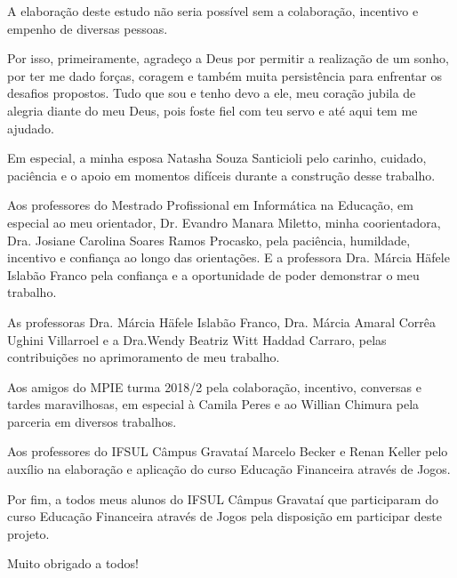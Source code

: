 

\begin{agradecimentos}
A elaboração deste estudo não seria possível sem a colaboração, incentivo e empenho de diversas pessoas.

Por isso, primeiramente, agradeço a Deus por permitir a realização de um sonho, por ter me dado forças, coragem e também muita persistência para enfrentar os desafios propostos. Tudo que sou e tenho devo a ele, meu coração jubila de alegria diante do meu Deus, pois foste fiel com teu servo e até aqui tem me ajudado.

Em especial, a minha esposa Natasha Souza Santicioli pelo carinho, cuidado, paciência e o apoio em momentos difíceis durante a construção desse trabalho.

Aos professores do Mestrado Profissional em Informática na Educação, em especial ao meu orientador, Dr. Evandro Manara Miletto, minha coorientadora, Dra. Josiane Carolina Soares Ramos Procasko, pela paciência, humildade, incentivo e confiança ao longo das orientações. E a professora Dra. Márcia Häfele Islabão Franco pela confiança e a oportunidade de poder demonstrar o meu trabalho.

As professoras Dra. Márcia Häfele Islabão Franco, Dra. Márcia Amaral Corrêa Ughini Villarroel e a Dra.Wendy Beatriz Witt Haddad Carraro, pelas contribuições no aprimoramento de meu trabalho. 

Aos amigos do MPIE turma 2018/2 pela colaboração, incentivo, conversas e tardes maravilhosas, em especial à Camila Peres e ao Willian Chimura pela parceria em diversos trabalhos.

Aos professores do IFSUL Câmpus Gravataí Marcelo Becker e Renan Keller pelo auxílio na elaboração e aplicação do curso Educação Financeira através de Jogos.

Por fim, a todos meus alunos do IFSUL Câmpus Gravataí que participaram do curso Educação Financeira através de Jogos pela disposição em participar deste projeto.

Muito obrigado a todos!
\end{agradecimentos}

